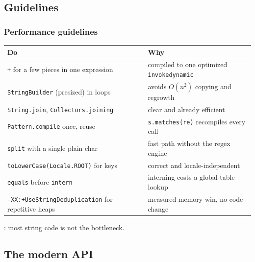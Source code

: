 \documentclass[aspectratio=169,10pt,compress]{beamer}
\begin{document}
\subsection[Guide]{Guidelines}




\begin{frame}[t,fragile] \frametitle{Performance guidelines}
  \small
  \begin{tabular}{@{}L{0.44\textwidth}L{0.5\textwidth}@{}}
    \toprule
    \textbf{Do} & \textbf{Why} \\
    \midrule
    \texttt{+} for a few pieces in one expression        & compiled to one optimized \texttt{invokedynamic} \\
    \texttt{StringBuilder} (presized) in loops            & avoids $O(n^{2})$ copying and regrowth \\
    \texttt{String.join}, \texttt{Collectors.joining}     & clear and already efficient \\
    \texttt{Pattern.compile} once, reuse                  & \texttt{s.matches(re)} recompiles every call \\
    \texttt{split} with a single plain char               & fast path without the regex engine \\
    \texttt{toLowerCase(Locale.ROOT)} for keys            & correct and locale-independent \\
    \texttt{equals} before \texttt{intern}                & interning costs a global table lookup \\
    \texttt{-XX:+UseStringDeduplication} for repetitive heaps & measured memory win, no code change \\
    \bottomrule
  \end{tabular}

  \vspace{0.4em}
  : most string code is not the bottleneck.
\end{frame}

\subsection[API]{The modern API}
\end{document}
